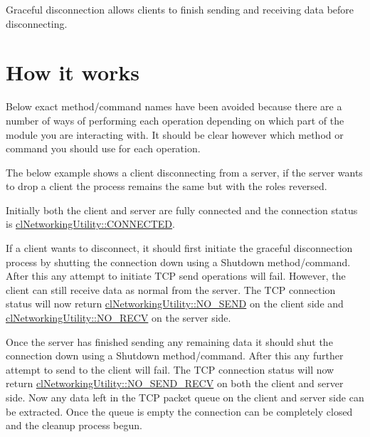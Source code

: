 Graceful disconnection allows clients to finish sending and receiving data before disconnecting. \hypertarget{gracefuldisconnectpage_howItWorks}{}\section{How it works}\label{gracefuldisconnectpage_howItWorks}
Below exact method/command names have been avoided because there are a number of ways of performing each operation depending on which part of the module you are interacting with. It should be clear however which method or command you should use for each operation. \par
\par


The below example shows a client disconnecting from a server, if the server wants to drop a client the process remains the same but with the roles reversed. \par
\par


Initially both the client and server are fully connected and the connection status is \hyperlink{classcl_networking_utility_a15dd34683154e07d5843f8f5432fec6da91a3fd8751354e5c4f32181268627d9f}{clNetworkingUtility::CONNECTED}.\par
 

If a client wants to disconnect, it should first initiate the graceful disconnection process by shutting the connection down using a Shutdown method/command. After this any attempt to initiate TCP send operations will fail. However, the client can still receive data as normal from the server. The TCP connection status will now return \hyperlink{classcl_networking_utility_a15dd34683154e07d5843f8f5432fec6dab8241425bb2dc77be7422346559bbb30}{clNetworkingUtility::NO\_\-SEND} on the client side and \hyperlink{classcl_networking_utility_a15dd34683154e07d5843f8f5432fec6daf36e05d04ad267b00184a32d654c3989}{clNetworkingUtility::NO\_\-RECV} on the server side. \par
 

Once the server has finished sending any remaining data it should shut the connection down using a Shutdown method/command. After this any further attempt to send to the client will fail. The TCP connection status will now return \hyperlink{classcl_networking_utility_a15dd34683154e07d5843f8f5432fec6da049f6833fe3ed9d08cfe5047078b73e3}{clNetworkingUtility::NO\_\-SEND\_\-RECV} on both the client and server side. Now any data left in the TCP packet queue on the client and server side can be extracted. Once the queue is empty the connection can be completely closed and the cleanup process begun. \par
  